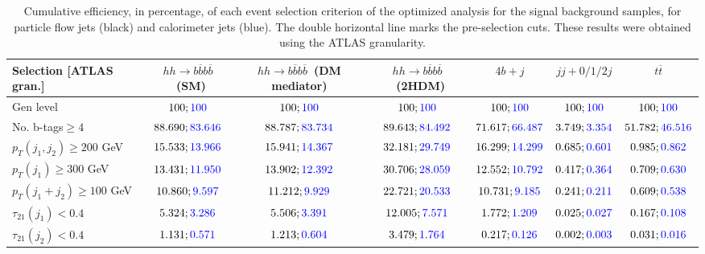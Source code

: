 \begin{landscape}
		\begin{table}
			\centering
			\caption{Cumulative efficiency, in percentage, of each event selection criterion of the optimized analysis for the signal background samples, for particle flow jets (black) and calorimeter jets (blue). The double horizontal line marks the pre-selection cuts. These results were obtained using the ATLAS granularity.}
			\begin{tabular}{lcccccc}
				\toprule 
				\textbf{Selection [ATLAS gran.]} & $hh\rightarrow b\overline{b}b\overline{b}$~(SM) & $hh\rightarrow b\overline{b}b\overline{b}$~(DM mediator) & $hh\rightarrow b\overline{b}b\overline{b}$~(2HDM) & $4b+j$  & $jj+0/1/2 j$ & $t\overline{t}$ \\
				\midrule
				Gen level & $100;\textcolor{blue}{100}$ & $100;\textcolor{blue}{100}$ &$100;\textcolor{blue}{100}$& $100;\textcolor{blue}{100}$& $100;\textcolor{blue}{100}$& $100;\textcolor{blue}{100}$ \\
				\rowcolor{black!7}No. b-tags$\geq 4$&$88.690;\textcolor{blue}{83.646}$&$88.787;\textcolor{blue}{83.734}$&$89.643;\textcolor{blue}{84.492}$&$71.617;\textcolor{blue}{66.487}$&$3.749;\textcolor{blue}{3.354}$&$51.782;\textcolor{blue}{46.516}$\\
				$p_T(j_1,j_2)\geq200$ GeV & $15.533;\textcolor{blue}{13.966}$ & $15.941;\textcolor{blue}{14.367}$&$32.181;\textcolor{blue}{29.749}$ &$16.299;\textcolor{blue}{14.299}$&$0.685;\textcolor{blue}{0.601}$&$0.985;\textcolor{blue}{0.862}$\\ 
				\midrule \midrule
				\rowcolor{black!7}$p_T(j_1)\geq 300$ GeV & $13.431;\textcolor{blue}{11.950}$ &$13.902;\textcolor{blue}{12.392}$  &$30.706;\textcolor{blue}{28.059}$&$12.552;\textcolor{blue}{10.792}$&$0.417;\textcolor{blue}{0.364}$&$0.709;\textcolor{blue}{0.630}$\\ 
				$p_T(j_1+j_2)\geq 100$ GeV &$10.860;\textcolor{blue}{9.597}$ & $11.212;\textcolor{blue}{9.929}$ &$22.721;\textcolor{blue}{20.533}$&$10.731;\textcolor{blue}{9.185}$&$0.241;\textcolor{blue}{0.211}$&$0.609;\textcolor{blue}{0.538}$\\
				\rowcolor{black!7}$\tau_{21}(j_1)<0.4$ & $5.324;\textcolor{blue}{3.286}$& $5.506;\textcolor{blue}{3.391}$&$12.005;\textcolor{blue}{7.571}$&$1.772;\textcolor{blue}{1.209}$&$0.025;\textcolor{blue}{0.027}$&$0.167;\textcolor{blue}{0.108}$\\
				$\tau_{21}(j_2)<0.4$ &$1.131;\textcolor{blue}{0.571}$ &$1.213;\textcolor{blue}{0.604}$ &$3.479;\textcolor{blue}{1.764}$&$0.217;\textcolor{blue}{0.126}$&$0.002;\textcolor{blue}{0.003}$&$0.031;\textcolor{blue}{0.016}$\\

\end{tabular}
\end{table}
\end{landscape}

